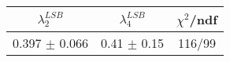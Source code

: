 \begin{tabular}{c|c||c}
$\lambda_{2}^{LSB}$ & $\lambda_4^{LSB}$ & $\chi^{2}$/ndf \\
\hline
0.397 $\pm$ 0.066 & 0.41 $\pm$ 0.15 & 116/99\\
\end{tabular}
